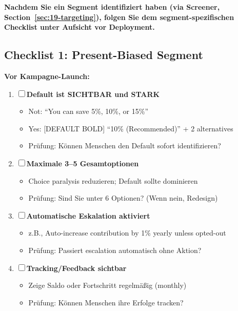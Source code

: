 \textbf{Nachdem Sie ein Segment identifiziert haben (via Screener, Section~\ref{sec:19-targeting}), folgen Sie dem segment-spezifischen Checklist unter Aufsicht vor Deployment.}

\subsection{Checklist 1: Present-Biased Segment}

\begin{tcolorbox}[colback=blue!5!white, colframe=blue!75!black, title=\textbf{Deployment Checklist: Present-Biased}]

\textbf{Vor Kampagne-Launch:}
\begin{enumerate}[label=\textbf{PB-\arabic*}]
\item ☐ \textbf{Default ist SICHTBAR und STARK}
  \begin{itemize}[nosep]
  \item Not: ``You can save 5\%, 10\%, or 15\%''
  \item Yes: [DEFAULT BOLD] ``10\% (Recommended)'' + 2 alternatives
  \item Prüfung: Können Menschen den Default sofort identifizieren?
  \end{itemize}

\item ☐ \textbf{Maximale 3--5 Gesamtoptionen}
  \begin{itemize}[nosep]
  \item Choice paralysis reduzieren; Default sollte dominieren
  \item Prüfung: Sind Sie unter 6 Optionen? (Wenn nein, Redesign)
  \end{itemize}

\item ☐ \textbf{Automatische Eskalation aktiviert}
  \begin{itemize}[nosep]
  \item z.B., Auto-increase contribution by 1\% yearly unless opted-out
  \item Prüfung: Passiert escalation automatisch ohne Aktion?
  \end{itemize}

\item ☐ \textbf{Tracking/Feedback sichtbar}
  \begin{itemize}[nosep]
  \item Zeige Saldo oder Fortschritt regelmäßig (monthly)
  \item Prüfung: Können Menschen ihre Erfolge tracken?
  \end{itemize}


\end{enumerate}
\end{tcolorbox}
